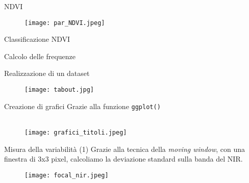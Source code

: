 \documentclass{beamer} %
\begin{document}
        
\begin{frame}{NDVI}

\begin{figure}
    \centering
    \texttt{[image: par\_NDVI.jpeg]}
\end{figure}
 \end{frame}
 
\begin{frame}{Classificazione NDVI}
    
\end{frame}

\begin{frame}{Calcolo delle frequenze}
     
\end{frame}

\begin{frame}{Realizzazione di un dataset}
     
     
    \begin{figure}
        \centering
        \texttt{[image: tabout.jpg]}
    \end{figure}
\end{frame}

\begin{frame}{Creazione di grafici}
Grazie alla funzione \texttt{ggplot()}
\\
\\
    \begin{figure}
        \centering
        \texttt{[image: grafici\_titoli.jpeg]}
    \end{figure}
\end{frame}

\begin{frame}{Misura della variabilità (1)}
Grazie alla tecnica della \textit{moving window}, con una finestra di 3x3 pixel, calcoliamo
la deviazione standard sulla banda del NIR.
\bigskip
    
    \begin{figure}
        \centering
        \texttt{[image: focal\_nir.jpeg]}
    \end{figure}
\end{frame}
\end{document}
